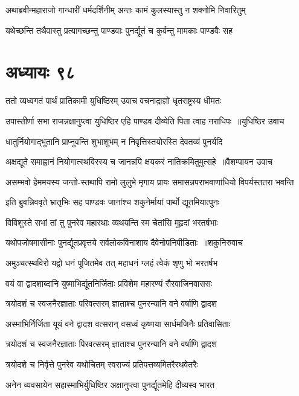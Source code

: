 \twolineshloka
{अथाब्रवीन्महाराजो गान्धारीं धर्मदर्शिनीम्}
{अन्तः कामं कुलस्यास्तु न शक्नोमि निवारितुम्}


\twolineshloka
{यथेच्छन्ति तथैवास्तु प्रत्यागच्छन्तु पाण्डवाः}
{पुनर्द्यूतं च कुर्वन्तु मामकाः पाण्डवैः सह}


\chapter{अध्यायः ९८}
\twolineshloka
{ततो व्यध्वगतं पार्थं प्रातिकामी युधिष्ठिरम्}
{उवाच वचनाद्राज्ञो धृतराष्ट्रस्य धीमतः}


\twolineshloka
{उपास्तीर्णा सभा राजन्नक्षानुप्त्वा युधिष्ठिर}
{एहि पाण्डव दीव्येति पिता त्वाह नराधिपः ॥युधिष्ठिर उवाच}


\twolineshloka
{धातुर्नियोगाद्भूतानि प्राप्नुवन्ति शुभाशुभम्}
{न निवृत्तिस्तयोरस्ति देवतव्यं पुनर्यदि}


\twolineshloka
{अक्षद्यूते समाह्वानं नियोगात्स्थविरस्य च}
{जानन्नपि क्षयकरं नातिक्रमितुमुत्सहे ॥वैशम्पायन उवाच}


\twolineshloka
{असम्भवो हेममयस्य जन्तो-स्तथापि रामो लुलुभे मृगाय}
{प्रायः समासन्नपराभवाणांधियो विपर्यस्ततरा भवन्ति}


\twolineshloka
{इति ब्रुवन्निववृते भ्रातृभिः सह पाण्डवः}
{जानांश्च शकुनेर्मायां पार्थो द्यूतमियात्पुनः}


\twolineshloka
{विविशुस्ते सभां तां तु पुनरेव महारथाः}
{व्यथयन्ति स्म चेतांसि मुहृदां भरतर्षभाः}


\twolineshloka
{यथोपजोषमासीनाः पुनर्द्यूतप्रवृत्तये}
{सर्वलोकविनाशाय दैवेनोपनिपीडिताः ॥शकुनिरुवाच}


\twolineshloka
{अमुञ्चत्स्थविरो यद्वो धनं पूजितमेव तत्}
{महाधनं ग्लहं त्वेकं शृणु भो भरतर्षभ}


\twolineshloka
{वयं वा द्वादशाब्दानि युष्माभिर्द्यूतनिर्जिताः}
{प्रविशेम महारण्यं रौरवाजिनवाससः}


\twolineshloka
{त्रयोदशं च स्वजनैरज्ञाताः परिवत्सरम्}
{ज्ञाताश्च पुनरन्यानि वने वर्षाणि द्वादश}


\twolineshloka
{अस्माभिर्निर्जिता यूयं वने द्वादश वत्सरान्}
{वसध्वं कृष्णया सार्धमजिनैः प्रतिवासिताः}


\twolineshloka
{त्रयोदशं च स्वजनैरज्ञाताः पिरवत्सरम्}
{ज्ञाताश्च पुनरन्यानि वने वर्षाणि द्वादश}


\twolineshloka
{त्रयोदशे च निर्वृत्ते पुनरेव यथोचितम्}
{स्वराज्यं प्रतिपत्तव्यमितरैरथवेतरैः}


\twolineshloka
{अनेन व्यवसायेन सहास्माभिर्युधिष्ठिर}
{अक्षानुप्त्वा पुनर्द्यूतमेहि दीव्यस्व भारत}


